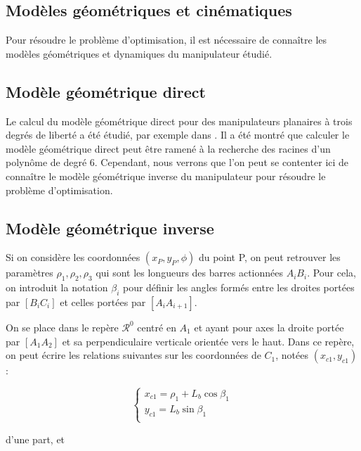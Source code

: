 \documentclass{article}
\begin{document}
\begin{multicols*}{2}
\section*{Modèles géométriques et cinématiques}

Pour résoudre le problème d'optimisation, il est nécessaire de connaître les modèles géométriques et dynamiques du manipulateur étudié.

\subsection*{Modèle géométrique direct}

Le calcul du modèle géométrique direct pour des manipulateurs planaires à trois degrés de liberté a été étudié, par exemple dans \cite{goss94}. Il a été montré que calculer le modèle géométrique direct peut être ramené à la recherche des racines d'un polynôme de degré 6. Cependant, nous verrons que l'on peut se contenter ici de connaître le modèle géométrique inverse du manipulateur pour résoudre le problème d'optimisation.

\subsection*{Modèle géométrique inverse}

Si on considère les coordonnées $(x_P, y_P, \phi)$ du point P, on peut retrouver les paramètres ${\rho_1, \rho_2, \rho_3}$ qui sont les longueurs des barres actionnées $A_i B_i$. Pour cela, on introduit la notation $\beta_i$ pour définir les angles formés entre les droites portées par $[B_i C_i]$ et celles portées par $[A_i A_{i+1}]$.

On se place dans le repère $\mathcal{R}^0$ centré en $A_1$ et ayant pour axes la droite portée par $[A_1 A_2]$ et sa perpendiculaire verticale orientée vers le haut. Dans ce repère, on peut écrire les relations suivantes sur les coordonnées de $C_1$, notées $(x_{c1}, y_{c1})$ :

\begin{equation}
    \begin{cases}
        x_{c1} = \rho_1 + L_b \cos{\beta_1}\\
        y_{c1} = L_b \sin{\beta_1}\\
       
    \end{cases}
\end{equation}

d'une part, et 


\end{multicols*}
\end{document}

